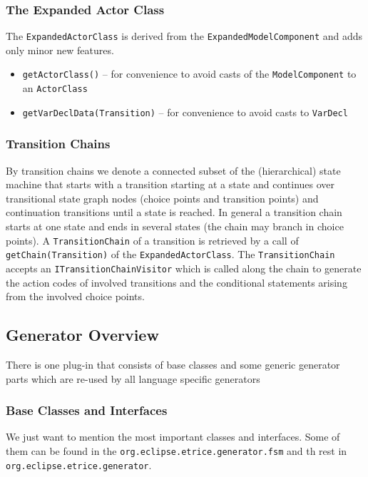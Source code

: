\subsubsection*{The Expanded Actor Class}

The \texttt{ExpandedActorClass} is derived from the \texttt{ExpandedModelComponent} and adds only minor new features.
\begin{itemize}
\item \texttt{getActorClass()} -- for convenience to avoid casts of the \texttt{ModelComponent} to an \texttt{ActorClass} 
\item \texttt{getVarDeclData(Transition)} -- for convenience to avoid casts to \texttt{VarDecl}
\end{itemize}

\subsubsection*{Transition Chains}

By transition chains we denote a connected subset of the (hierarchical) state machine that starts with a 
transition starting at a state and continues over transitional state graph nodes (choice points and 
transition points) and continuation transitions until a state is reached. In general a transition chain 
starts at one state and ends in several states (the chain may branch in choice points).
A \texttt{TransitionChain} of a transition is retrieved by a call of \texttt{getChain(Transition)} of the 
\texttt{ExpandedActorClass}.
The \texttt{TransitionChain} accepts an \texttt{ITransitionChainVisitor} which is called along the chain 
to generate the action codes of involved transitions and the conditional statements arising from the 
involved choice points. 

\subsection{Generator Overview}

There is one plug-in that consists of base classes and some generic generator parts which are re-used by 
all language specific generators
 
\subsubsection*{Base Classes and Interfaces}

We just want to mention the most important classes and interfaces.
Some of them can be found in the \texttt{org.eclipse.etrice.generator.fsm} and th rest
in \texttt{org.eclipse.etrice.generator}.

